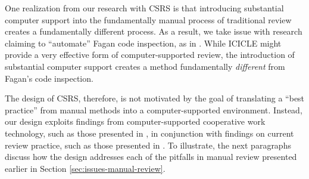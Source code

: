 One realization from our research with CSRS is that introducing substantial
computer support into the fundamentally manual process of traditional
review creates a fundamentally different process.  As a result, we take
issue with research claiming to ``automate'' Fagan code inspection, as in
\cite{Brothers90}.  While ICICLE might provide a very effective form of
computer-supported review, the introduction of substantial computer support
creates a method fundamentally {\em different}\/ from Fagan's code
inspection.

The design of CSRS, therefore, is not motivated by the goal of translating
a ``best practice'' from manual methods into a computer-supported
environment. Instead, our design exploits findings from computer-supported
cooperative work technology, such as those presented in \cite{Nunamaker91},
in conjunction with findings on current review practice, such as those
presented in \cite{Deimel91,Freedman90}.  To illustrate, the next
paragraphs discuss how the design addresses each of the pitfalls in manual
review presented earlier in Section \ref{sec:issues-manual-review}.

